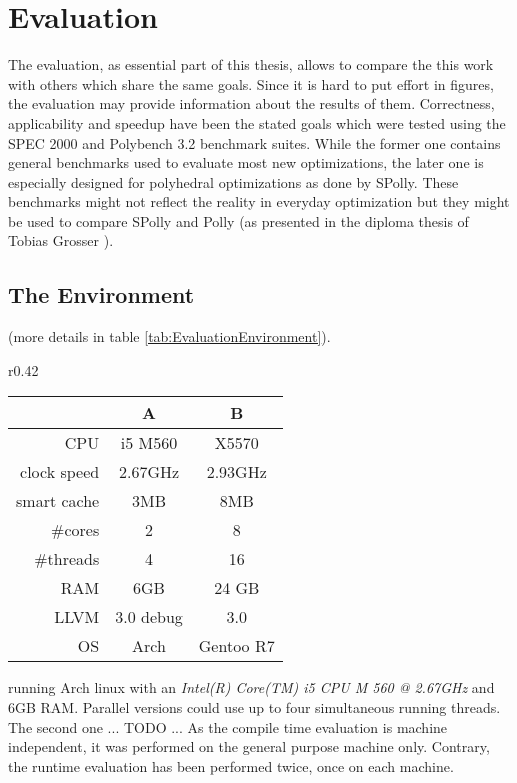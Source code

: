 
\chapter{Evaluation} %
\label{Chapter4}

\red
\begin{shaded}

The evaluation, as essential part of this thesis, allows to compare the this 
work with others which share the same goals. Since it is hard to put effort in
figures, the evaluation may provide information about the results of them.
Correctness, applicability and speedup have been the stated goals which were 
tested using the SPEC 2000 and Polybench 3.2 benchmark suites. While the former
one contains general benchmarks used to evaluate most new optimizations, the 
later one is especially designed for polyhedral optimizations as done by SPolly.
These benchmarks might not reflect the reality in everyday optimization but
they might be used to compare SPolly and Polly 
(as presented in the diploma thesis of Tobias Grosser \cite{grosser:thesis}).


\section{The Environment}

(more details in table \ref{tab:EvaluationEnvironment}). 
\begin{wraptable}[]{r}{0.42\textwidth}
  \caption{The evaluation environment}
  \begin{center}
    \begin{tabular}{ r | c c }
      & A & B \\
      \hline
            CPU & i5 M560 & X5570 \\ 
    clock speed & 2.67GHz & 2.93GHz \\
    smart cache & 3MB & 8MB \\
        \#cores & 2 & 8 \\
      \#threads & 4 & 16 \\
            RAM & 6GB & 24 GB \\
           LLVM & 3.0 debug & 3.0 \\
             OS & Arch  & Gentoo R7 \\
    \end{tabular}
  \end{center}
  \label{tab:EvaluationEnvironment}
\end{wraptable}
running Arch linux with an
\textit{Intel(R) Core(TM) i5 CPU M 560 @ 2.67GHz} and 6GB RAM. Parallel versions
could use up to four simultaneous running threads. 
The second one ... TODO ... 
As the compile time evaluation is machine independent, it was 
performed on the general purpose machine only. Contrary, the runtime evaluation 
has been performed twice, once on each machine. 


\end{shaded}
